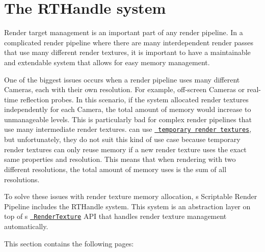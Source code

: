 \chapter{The RTHandle system}
\hypertarget{md__hey_tea_9_2_library_2_package_cache_2com_8unity_8render-pipelines_8core_0d14_80_88_2_documentation_0i_2rthandle-system}{}\label{md__hey_tea_9_2_library_2_package_cache_2com_8unity_8render-pipelines_8core_0d14_80_88_2_documentation_0i_2rthandle-system}
\label{md__hey_tea_9_2_library_2_package_cache_2com_8unity_8render-pipelines_8core_0d14_80_88_2_documentation_0i_2rthandle-system_autotoc_md1853}%
%
 Render target management is an important part of any render pipeline. In a complicated render pipeline where there are many interdependent render passes that use many different render textures, it is important to have a maintainable and extendable system that allows for easy memory management.

One of the biggest issues occurs when a render pipeline uses many different Cameras, each with their own resolution. For example, off-\/screen Cameras or real-\/time reflection probes. In this scenario, if the system allocated render textures independently for each Camera, the total amount of memory would increase to unmanageable levels. This is particularly bad for complex render pipelines that use many intermediate render textures.  can use \href{https://docs.unity3d.com/ScriptReference/RenderTexture.GetTemporary.html}{\texttt{ temporary render textures}}, but unfortunately, they do not suit this kind of use case because temporary render textures can only reuse memory if a new render texture uses the exact same properties and resolution. This means that when rendering with two different resolutions, the total amount of memory  uses is the sum of all resolutions.

To solve these issues with render texture memory allocation, \textquotesingle{}s Scriptable Render Pipeline includes the RTHandle system. This system is an abstraction layer on top of \textquotesingle{}s \href{https://docs.unity3d.com/ScriptReference/RenderTexture.html}{\texttt{ Render\+Texture}} API that handles render texture management automatically.

This section contains the following pages\+:


\begin{DoxyItemize}
\item {}
\item {} 
\end{DoxyItemize}